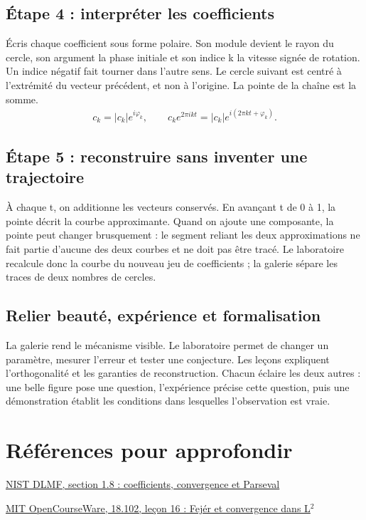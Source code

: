 \documentclass[11pt,a4paper]{article}
\begin{document}
\subsection{Étape 4 : interpréter les coefficients}
Écris chaque coefficient sous forme polaire. Son module devient le rayon du cercle, son argument la phase initiale et son indice k la vitesse signée de rotation. Un indice négatif fait tourner dans l’autre sens. Le cercle suivant est centré à l’extrémité du vecteur précédent, et non à l’origine. La pointe de la chaîne est la somme.
\[\begin{gathered}c_k=|c_k|e^{i\varphi_k},\qquad c_ke^{2\pi ikt}=|c_k|e^{i(2\pi kt+\varphi_k)}.\end{gathered}\]
\subsection{Étape 5 : reconstruire sans inventer une trajectoire}
À chaque t, on additionne les vecteurs conservés. En avançant t de 0 à 1, la pointe décrit la courbe approximante. Quand on ajoute une composante, la pointe peut changer brusquement : le segment reliant les deux approximations ne fait partie d’aucune des deux courbes et ne doit pas être tracé. Le laboratoire recalcule donc la courbe du nouveau jeu de coefficients ; la galerie sépare les traces de deux nombres de cercles.
\subsection{Relier beauté, expérience et formalisation}
La galerie rend le mécanisme visible. Le laboratoire permet de changer un paramètre, mesurer l’erreur et tester une conjecture. Les leçons expliquent l’orthogonalité et les garanties de reconstruction. Chacun éclaire les deux autres : une belle figure pose une question, l’expérience précise cette question, puis une démonstration établit les conditions dans lesquelles l’observation est vraie.
\clearpage
\section*{Références pour approfondir}
\par\href{https://dlmf.nist.gov/1.8}{NIST DLMF, section 1.8 : coefficients, convergence et Parseval}
\par\href{https://ocw.mit.edu/courses/18-102-introduction-to-functional-analysis-spring-2021/resources/lecture-16-fejers-theorem-and-convergence-of-fourier-series/}{MIT OpenCourseWare, 18.102, leçon 16 : Fejér et convergence dans L$^2$}
\end{document}
